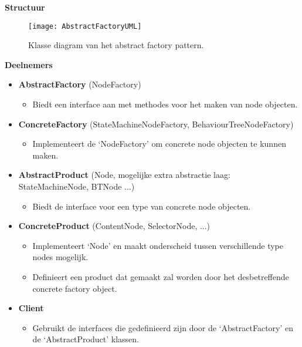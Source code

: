 \noindent\textbf{Structuur}

\begin{figure}[H]
    \centering    
    \texttt{[image: AbstractFactoryUML]}
    \caption[]{Klasse diagram van het abstract factory pattern. \footnotemark}
    \label{fig:abstractfactoryuml}
\end{figure}

\noindent\textbf{Deelnemers}
\begin{itemize}
    \item \textbf{AbstractFactory} (NodeFactory)
    \begin{itemize}
        \item Biedt een interface aan met methodes voor het maken van node objecten.
    \end{itemize}

    \item \textbf{ConcreteFactory} (StateMachineNodeFactory, BehaviourTreeNodeFactory)
    \begin{itemize}
        \item Implementeert de ‘NodeFactory’ om concrete node objecten te kunnen maken.
    \end{itemize}

    \item \textbf{AbstractProduct} (Node, mogelijke extra abstractie laag: StateMachineNode, BTNode ...)
    \begin{itemize}
        \item Biedt de interface voor een type van concrete node objecten.
    \end{itemize}
    \item \textbf{ConcreteProduct} (ContentNode, SelectorNode, ...)
    \begin{itemize}
        \item Implementeert ‘Node’ en maakt onderscheid tussen verschillende type nodes mogelijk.
        \item Definieert een product dat gemaakt zal worden door het desbetreffende concrete factory object.
    \end{itemize}
    \item \textbf{Client}
    \begin{itemize}
        \item Gebruikt de interfaces die gedefinieerd zijn door de ‘AbstractFactory’ en de ‘AbstractProduct’ klassen.
    \end{itemize}
\end{itemize}

